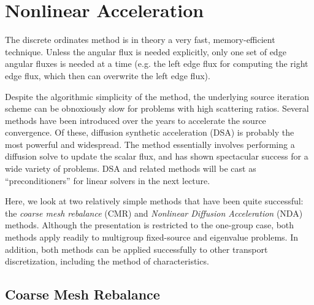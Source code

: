 \chapter{Nonlinear Acceleration}
\label{lec:nonlinear_acceleration}

The discrete ordinates method is in theory a very fast, memory-efficient 
technique.  Unless the angular flux is needed explicitly, only one set of edge 
angular fluxes is needed at a time (e.g. the left edge flux for computing the 
right edge flux, which then can overwrite the left edge flux).  

Despite the algorithmic simplicity of the method, the underlying source 
iteration scheme can be obnoxiously slow for problems with high scattering 
ratios.  Several methods have been introduced over the years to accelerate the 
source convergence.  Of these, diffusion synthetic acceleration (DSA) is 
probably the most powerful and widespread.  The method essentially involves 
performing a diffusion solve to update the scalar flux, and has shown 
spectacular success for a wide variety of problems.  DSA and related 
methods will be cast as ``preconditioners'' for linear solvers
in the next lecture.

Here, we look at two  relatively simple 
methods that have been quite successful: the \textit{coarse mesh rebalance} 
(CMR) and \textit{Nonlinear Diffusion Acceleration} (NDA) methods.  
Although the presentation is restricted to the one-group case, both 
methods apply readily to multigroup fixed-source and eigenvalue problems.
In addition, both methods can be applied successfully to other 
transport discretization, including the method of characteristics.

\section*{Coarse Mesh Rebalance}

